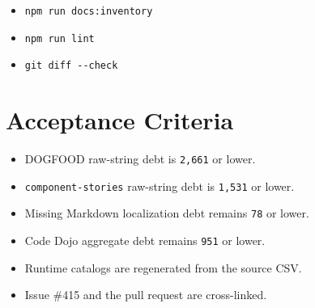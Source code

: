 \begin{itemize}
\item
  \texttt{n\allowbreak{}p\allowbreak{}m\allowbreak{} \allowbreak{}r\allowbreak{}u\allowbreak{}n\allowbreak{} \allowbreak{}d\allowbreak{}o\allowbreak{}c\allowbreak{}s\allowbreak{}:\allowbreak{}i\allowbreak{}n\allowbreak{}v\allowbreak{}e\allowbreak{}n\allowbreak{}t\allowbreak{}o\allowbreak{}r\allowbreak{}y}
\item
  \texttt{n\allowbreak{}p\allowbreak{}m\allowbreak{} \allowbreak{}r\allowbreak{}u\allowbreak{}n\allowbreak{} \allowbreak{}l\allowbreak{}i\allowbreak{}n\allowbreak{}t}
\item
  \texttt{g\allowbreak{}i\allowbreak{}t\allowbreak{} \allowbreak{}d\allowbreak{}i\allowbreak{}f\allowbreak{}f\allowbreak{} \allowbreak{}-\allowbreak{}-\allowbreak{}c\allowbreak{}h\allowbreak{}e\allowbreak{}c\allowbreak{}k}
\end{itemize}

\section{Acceptance Criteria}\label{record-197-acceptance-criteria}

\begin{itemize}
\tightlist
\item
  DOGFOOD raw-string debt is \texttt{2\allowbreak{},\allowbreak{}6\allowbreak{}6\allowbreak{}1} or lower.
\item
  \texttt{c\allowbreak{}o\allowbreak{}m\allowbreak{}p\allowbreak{}o\allowbreak{}n\allowbreak{}e\allowbreak{}n\allowbreak{}t\allowbreak{}-\allowbreak{}s\allowbreak{}t\allowbreak{}o\allowbreak{}r\allowbreak{}i\allowbreak{}e\allowbreak{}s} raw-string debt is \texttt{1\allowbreak{},\allowbreak{}5\allowbreak{}3\allowbreak{}1} or lower.
\item
  Missing Markdown localization debt remains \texttt{7\allowbreak{}8} or lower.
\item
  Code Dojo aggregate debt remains \texttt{9\allowbreak{}5\allowbreak{}1} or lower.
\item
  Runtime catalogs are regenerated from the source CSV.
\item
  Issue \#415 and the pull request are cross-linked.
\end{itemize}

